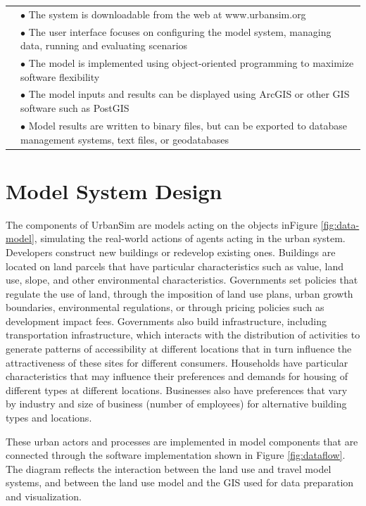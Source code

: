 \begin{table}[htp]
\begin{center}
\begin{tabular}{ p{1.5in}  p{4.4in}  }
& $\bullet$  The system is downloadable from the web at www.urbansim.org\\
&  $\bullet$   The user interface focuses on configuring the model system, managing data, running and evaluating scenarios\\
& $\bullet$    The model is implemented using object-oriented programming to maximize software flexibility\\
&  $\bullet$   The model inputs and results can be displayed using ArcGIS or other GIS software such as PostGIS\\
&  $\bullet$   Model results are written to binary files, but can be exported to database management systems, text files, or geodatabases\\
\bottomrule
\end{tabular}
\end{center}
\end{table}

\section{Model System Design}

The components of UrbanSim are models acting on the objects inFigure \ref{fig:data-model}, simulating the real-world actions of agents acting in the urban system.  Developers construct new buildings or redevelop existing ones.  Buildings are located on land parcels that have particular characteristics such as value, land use, slope, and other environmental characteristics.  Governments set policies that regulate the use of land, through the imposition of land use plans, urban growth boundaries, environmental regulations, or through pricing policies such as development impact fees.  Governments also build infrastructure, including transportation infrastructure, which interacts with the distribution of activities to generate patterns of accessibility at different locations that in turn influence the attractiveness of these sites for different consumers.  Households have particular characteristics that may influence their preferences and demands for housing of different types at different locations.  Businesses also have preferences that vary by industry and size of business (number of employees) for alternative building types and locations.

These urban actors and processes are implemented in model components that are connected through the software implementation shown in Figure \ref{fig:dataflow}. The diagram reflects the interaction between the land use and travel model systems, and between the land use model and the GIS used for data preparation and visualization.

